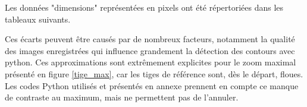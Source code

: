 \documentclass[11pt,letterpaper]{article}
\begin{document}
Les données "dimensions" représentées en pixels ont été répertoriées dans les tableaux suivants.

\begin{table}[h!]
\centering
{}
\caption{Tableau du nombre de pixels en fonction des tiges de référence pour le zoom minimum.}
\label{tige_min}
\end{table}

\begin{table}[h!]
\centering
{}
\caption{Tableau du nombre de pixels en fonction des tiges de référence pour le zoom maximum.}
\label{tige_max}
\end{table}

Ces écarts peuvent être causés par de nombreux facteurs, notamment la qualité des images enregistrées qui influence grandement la détection des contours avec python. Ces approximations sont extrêmement explicites pour le zoom maximal présenté en figure \ref{tige_max}, car les tiges de référence sont, dès le départ, floues. Les codes Python utilisés et présentés en annexe prennent en compte ce manque de contraste au maximum, mais ne permettent pas de l'annuler.
\end{document}
